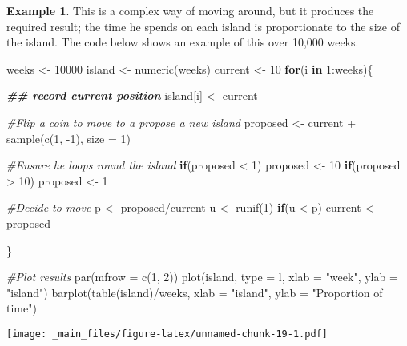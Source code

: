 \documentclass[
]{book}
\newenvironment{Shaded}{\begin{snugshade}}{\end{snugshade}}
\newcommand{\AttributeTok}[1]{\textcolor[rgb]{0.77,0.63,0.00}{#1}}
\newcommand{\CommentTok}[1]{\textcolor[rgb]{0.56,0.35,0.01}{\textit{#1}}}
\newcommand{\ControlFlowTok}[1]{\textcolor[rgb]{0.13,0.29,0.53}{\textbf{#1}}}
\newcommand{\DecValTok}[1]{\textcolor[rgb]{0.00,0.00,0.81}{#1}}
\newcommand{\DocumentationTok}[1]{\textcolor[rgb]{0.56,0.35,0.01}{\textbf{\textit{#1}}}}
\newcommand{\FunctionTok}[1]{\textcolor[rgb]{0.00,0.00,0.00}{#1}}
\newcommand{\NormalTok}[1]{#1}
\newcommand{\OtherTok}[1]{\textcolor[rgb]{0.56,0.35,0.01}{#1}}
\newcommand{\SpecialCharTok}[1]{\textcolor[rgb]{0.00,0.00,0.00}{#1}}
\newcommand{\StringTok}[1]{\textcolor[rgb]{0.31,0.60,0.02}{#1}}
\theoremstyle{definition}
\theoremstyle{definition}
\newtheorem{example}{Example}[chapter]
\theoremstyle{definition}
\theoremstyle{definition}
\theoremstyle{remark}
\begin{document}
\begin{example}
This is a complex way of moving around, but it produces the required result; the time he spends on each island is proportionate to the size of the island. The code below shows an example of this over 10,000 weeks.

\begin{Shaded}
\begin{Highlighting}[]
\NormalTok{weeks }\OtherTok{\textless{}{-}} \DecValTok{10000}
\NormalTok{island }\OtherTok{\textless{}{-}} \FunctionTok{numeric}\NormalTok{(weeks)}
\NormalTok{current }\OtherTok{\textless{}{-}} \DecValTok{10}
\ControlFlowTok{for}\NormalTok{(i }\ControlFlowTok{in} \DecValTok{1}\SpecialCharTok{:}\NormalTok{weeks)\{}
  
  \DocumentationTok{\#\# record current position}
\NormalTok{  island[i] }\OtherTok{\textless{}{-}}\NormalTok{ current}
  
  \CommentTok{\#Flip a coin to move to a propose a new island}
\NormalTok{  proposed }\OtherTok{\textless{}{-}}\NormalTok{ current }\SpecialCharTok{+} \FunctionTok{sample}\NormalTok{(}\FunctionTok{c}\NormalTok{(}\DecValTok{1}\NormalTok{, }\SpecialCharTok{{-}}\DecValTok{1}\NormalTok{), }\AttributeTok{size =} \DecValTok{1}\NormalTok{)}
  
  \CommentTok{\#Ensure he loops round the island}
  \ControlFlowTok{if}\NormalTok{(proposed }\SpecialCharTok{\textless{}} \DecValTok{1}\NormalTok{) }
\NormalTok{    proposed }\OtherTok{\textless{}{-}} \DecValTok{10}
  \ControlFlowTok{if}\NormalTok{(proposed }\SpecialCharTok{\textgreater{}} \DecValTok{10}\NormalTok{)}
\NormalTok{    proposed }\OtherTok{\textless{}{-}} \DecValTok{1}
  
  \CommentTok{\#Decide to move}
\NormalTok{  p }\OtherTok{\textless{}{-}}\NormalTok{ proposed}\SpecialCharTok{/}\NormalTok{current}
\NormalTok{  u }\OtherTok{\textless{}{-}} \FunctionTok{runif}\NormalTok{(}\DecValTok{1}\NormalTok{)}
  \ControlFlowTok{if}\NormalTok{(u }\SpecialCharTok{\textless{}}\NormalTok{ p)}
\NormalTok{    current }\OtherTok{\textless{}{-}}\NormalTok{ proposed}
  
  
\NormalTok{\}}

\CommentTok{\#Plot results}
\FunctionTok{par}\NormalTok{(}\AttributeTok{mfrow =} \FunctionTok{c}\NormalTok{(}\DecValTok{1}\NormalTok{, }\DecValTok{2}\NormalTok{))}
\FunctionTok{plot}\NormalTok{(island, }\AttributeTok{type =} \StringTok{\textquotesingle{}l\textquotesingle{}}\NormalTok{, }\AttributeTok{xlab =} \StringTok{"week"}\NormalTok{, }\AttributeTok{ylab =} \StringTok{"island"}\NormalTok{)}
\FunctionTok{barplot}\NormalTok{(}\FunctionTok{table}\NormalTok{(island)}\SpecialCharTok{/}\NormalTok{weeks, }\AttributeTok{xlab =} \StringTok{"island"}\NormalTok{, }\AttributeTok{ylab =} \StringTok{"Proportion of time"}\NormalTok{)}
\end{Highlighting}
\end{Shaded}

\texttt{[image: \_main\_files/figure-latex/unnamed-chunk-19-1.pdf]}
\end{example}
\end{document}
